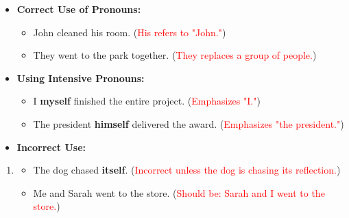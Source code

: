 \documentclass[12pt]{article}
\begin{document}
\begin{tcolorbox}[colframe=black!60, colback=white, 
coltitle=black, colbacktitle=black!15, fonttitle=\bfseries\Large, 
title=Examples, halign title=center, left=10pt, right=10pt, top=10pt, bottom=15pt]

\begin{itemize}
    \item \textbf{Correct Use of Pronouns:} 
    \begin{itemize}
        \item John cleaned his room. (\textcolor{red}{His refers to "John."})
        \item They went to the park together. (\textcolor{red}{They replaces a group of people.})
    \end{itemize}

    \item \textbf{Using Intensive Pronouns:}
    \begin{itemize}
        \item I \textbf{myself} finished the entire project. (\textcolor{red}{Emphasizes "I."})
        \item The president \textbf{himself} delivered the award. (\textcolor{red}{Emphasizes "the president."})
    \end{itemize}
\end{itemize}

\begin{itemize}
    \item \textbf{Incorrect Use:}
\end{itemize}
\begin{enumerate}
\item
    \begin{itemize}
        \item The dog chased \textbf{itself}. (\textcolor{red}{Incorrect unless the dog is chasing its reflection.})
        \item Me and Sarah went to the store. (\textcolor{red}{Should be: Sarah and I went to the store.})
    \end{itemize}
\end{enumerate}

\end{tcolorbox}

\vspace{1em}
\end{document}

